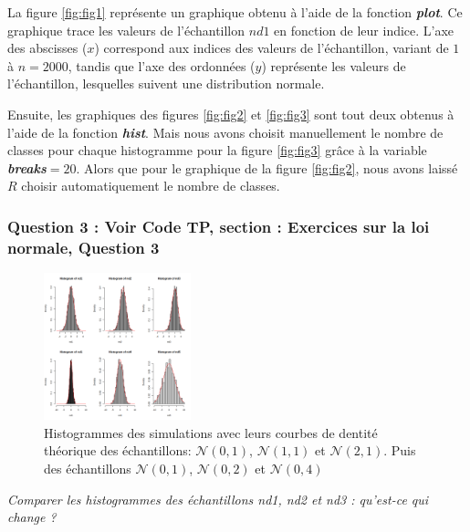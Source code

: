               La figure \ref{fig:fig1} représente un graphique obtenu à l'aide de la fonction \textbf{\textit{plot}}. 
              Ce graphique trace les valeurs de l'échantillon $nd1$ en fonction de leur indice. L'axe des abscisses ($x$) correspond aux indices des valeurs de l'échantillon, variant de $1$ à $n=2000$, tandis que l'axe des ordonnées ($y$) représente les valeurs de l'échantillon, lesquelles suivent une distribution normale.

              Ensuite, les graphiques des figures \ref{fig:fig2} et \ref{fig:fig3} sont tout deux obtenus à l'aide de la fonction \textbf{\textit{hist}}. Mais nous avons choisit manuellement le nombre de classes pour chaque histogramme pour la figure \ref{fig:fig3} grâce à la variable \textbf{\textit{breaks}}$=20$. Alors que pour le graphique de la figure \ref{fig:fig2}, nous avons laissé $R$ choisir automatiquement le nombre de classes.

        \subsubsection{Question 3 : Voir Code TP, section : Exercices sur la loi normale, Question 3 \cite{TP}}

            \begin{figure}[H]
                \centering
                \includegraphics[width=0.38\textwidth]{4_attachments/figures/output24.png}
                \caption{Histogrammes des simulations avec leurs courbes de dentité théorique des échantillons: $\mathcal N(0,1)$, $\mathcal N(1,1)$ et $\mathcal N(2,1)$. Puis des échantillons $\mathcal N(0,1)$, $\mathcal N(0,2)$ et $\mathcal N(0,4)$}
                \label{fig:comparaison}
            \end{figure}

            \begin{center}
                \textit{Comparer les histogrammes des échantillons nd1, nd2 et nd3 : qu’est-ce qui change ?}
            \end{center}

